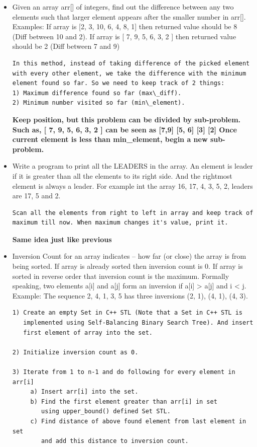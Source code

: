 \documentclass[a4paper,12pt,twoside]{book}
\begin{document}
\begin{itemize}
\item Given an array arr[] of integers, find out the difference between any two elements such that larger element appears after the smaller number in arr[]. Examples: If array is [2, 3, 10, 6, 4, 8, 1] then returned value should be 8 (Diff between 10 and 2). If array is [ 7, 9, 5, 6, 3, 2 ] then returned value should be 2 (Diff between 7 and 9)
\begin{lstlisting}[breaklines]
In this method, instead of taking difference of the picked element with every other element, we take the difference with the minimum element found so far. So we need to keep track of 2 things:
1) Maximum difference found so far (max\_diff).
2) Minimum number visited so far (min\_element).
\end{lstlisting}
\textbf{Keep position, but this problem can be divided by sub-problem. Such as, [ 7, 9, 5, 6, 3, 2 ] can be seen as [7,9] [5, 6] [3] [2]  Once current element is less than min\_element, begin a new sub-problem.}

\item Write a program to print all the LEADERS in the array. An element is leader if it is greater than all the elements to its right side. And the rightmost element is always a leader. For example int the array {16, 17, 4, 3, 5, 2}, leaders are 17, 5 and 2. 
\begin{lstlisting}[breaklines]
Scan all the elements from right to left in array and keep track of maximum till now. When maximum changes it's value, print it.
\end{lstlisting}
\textbf{Same idea just like previous}

\item Inversion Count for an array indicates -- how far (or close) the array is from being sorted. If array is already sorted then inversion count is 0. If array is sorted in reverse order that inversion count is the maximum. Formally speaking, two elements a[i] and a[j] form an inversion if a[i] > a[j] and i < j. Example:
The sequence 2, 4, 1, 3, 5 has three inversions (2, 1), (4, 1), (4, 3).

\begin{lstlisting}[breaklines]
1) Create an empty Set in C++ STL (Note that a Set in C++ STL is 
   implemented using Self-Balancing Binary Search Tree). And insert
   first element of array into the set.

2) Initialize inversion count as 0.

3) Iterate from 1 to n-1 and do following for every element in arr[i]
     a) Insert arr[i] into the set.
     b) Find the first element greater than arr[i] in set
        using upper_bound() defined Set STL.
     c) Find distance of above found element from last element in set
        and add this distance to inversion count.


\end{lstlisting}
\end{itemize}
\end{document}

